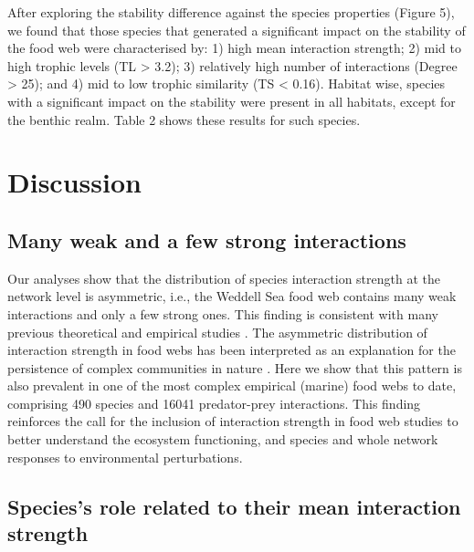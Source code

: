 \documentclass[gc, manuscript]{copernicus}
\begin{document}
After exploring the stability difference against the species properties
(Figure 5), we found that those species that generated a significant
impact on the stability of the food web were characterised by: 1) high
mean interaction strength; 2) mid to high trophic levels (TL
\textgreater{} 3.2); 3) relatively high number of interactions (Degree
\textgreater{} 25); and 4) mid to low trophic similarity (TS \textless{}
0.16). Habitat wise, species with a significant impact on the stability
were present in all habitats, except for the benthic realm. Table 2
shows these results for such species.

\section{Discussion}

\subsection{Many weak and a few strong interactions}

Our analyses show that the distribution of species interaction strength
at the network level is asymmetric, i.e., the Weddell Sea food web
contains many weak interactions and only a few strong ones. This finding
is consistent with many previous theoretical and empirical studies
\citep[e.g.][]{McCann1998, Neutel2002, Emmerson2004, Wootton2005, Kortsch2021}.
The asymmetric distribution of interaction strength in food webs has
been interpreted as an explanation for the persistence of complex
communities in nature \citep{Bascompte2005, Allesina2015, Nilsson2016}.
Here we show that this pattern is also prevalent in one of the most
complex empirical (marine) food webs to date, comprising 490 species and
16041 predator-prey interactions. This finding reinforces the call for
the inclusion of interaction strength in food web studies to better
understand the ecosystem functioning, and species and whole network
responses to environmental perturbations.

\subsection{Species's role related to their mean interaction strength}
\end{document}
